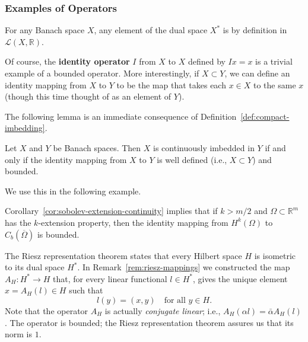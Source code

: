 \subsubsection{Examples of Operators}\label{subsec:operator-examples}

\begin{Example}
\label{ex:dual-functional-bounded-operator}
For any Banach space $X$, any element of the dual space $X^*$ is by definition in $\mathcal{L}(X,\mathbb{R})$.
\end{Example}

\begin{Example}
\label{ex:identity-operator-and-inclusion}
Of course, the \textbf{identity operator} $I$ from $X$ to $X$ defined by $Ix=x$ is a trivial example of a bounded operator. More interestingly, if $X\subset Y$, we can define an identity mapping from $X$ to $Y$ to be the map that takes each $x\in X$ to the same $x$ (though this time thought of as an element of $Y$).
\end{Example}

The following lemma is an immediate consequence of Definition~\ref{def:compact-imbedding}.

\begin{Lemma}
\label{lem:identity-bounded-continuous-embedding}
Let $X$ and $Y$ be Banach spaces. Then $X$ is continuously imbedded in $Y$ if and only if the identity mapping from $X$ to $Y$ is well defined (i.e., $X\subset Y$) and bounded.
\end{Lemma}

We use this in the following example.

\begin{Example}
\label{ex:sobolev-identity-inclusion-bounded}
Corollary~\ref{cor:sobolev-extension-continuity} implies that if $k>m/2$ and $\Omega\subset\mathbb{R}^m$ has the $k$-extension property, then the identity mapping from $H^k(\Omega)$ to $C_b(\overline\Omega)$ is bounded.
\end{Example}

\begin{Example}
\label{ex:riesz-map-conjugate-linear-operator}
The Riesz representation theorem states that every Hilbert space $H$ is isometric to its dual space $H^*$. In Remark~\ref{rem:riesz-mappings} we constructed the map $A_H:H^*\to H$ that, for every linear functional $l\in H^*$, gives the unique element $x=A_H(l)\in H$ such that\[l(y)=(x,y)\quad\text{for all }y\in H.\]Note that the operator $A_H$ is actually \emph{conjugate linear}; i.e., $A_H(\alpha l)=\bar\alpha A_H(l)$. The operator is bounded; the Riesz representation theorem assures us that its norm is $1$.
\end{Example}

